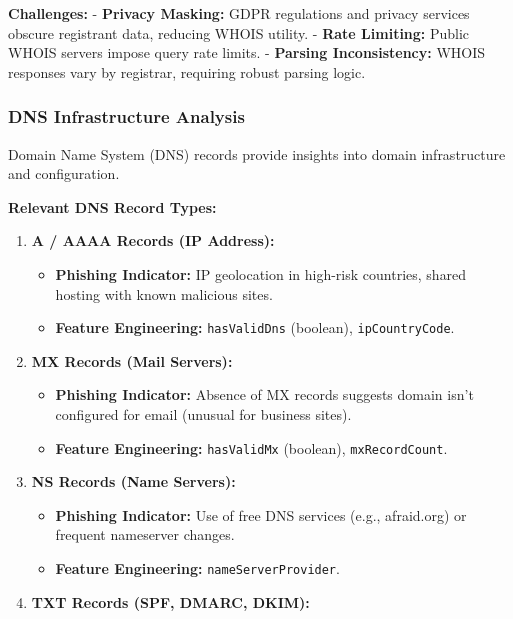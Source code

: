 \textbf{Challenges:} - \textbf{Privacy Masking:} GDPR regulations and
privacy services obscure registrant data, reducing WHOIS utility. -
\textbf{Rate Limiting:} Public WHOIS servers impose query rate limits. -
\textbf{Parsing Inconsistency:} WHOIS responses vary by registrar,
requiring robust parsing logic.

\subsubsection{DNS Infrastructure
Analysis}\label{dns-infrastructure-analysis}

Domain Name System (DNS) records provide insights into domain
infrastructure and configuration.

\textbf{Relevant DNS Record Types:}

\begin{enumerate}

\item
  \textbf{A / AAAA Records (IP Address):}

  \begin{itemize}
    \item
    \textbf{Phishing Indicator:} IP geolocation in high-risk countries,
    shared hosting with known malicious sites.
  \item
    \textbf{Feature Engineering:} \texttt{hasValidDns} (boolean),
    \texttt{ipCountryCode}.
  \end{itemize}
\item
  \textbf{MX Records (Mail Servers):}

  \begin{itemize}
    \item
    \textbf{Phishing Indicator:} Absence of MX records suggests domain
    isn't configured for email (unusual for business sites).
  \item
    \textbf{Feature Engineering:} \texttt{hasValidMx} (boolean),
    \texttt{mxRecordCount}.
  \end{itemize}
\item
  \textbf{NS Records (Name Servers):}

  \begin{itemize}
    \item
    \textbf{Phishing Indicator:} Use of free DNS services (e.g.,
    afraid.org) or frequent nameserver changes.
  \item
    \textbf{Feature Engineering:} \texttt{nameServerProvider}.
  \end{itemize}
\item
  \textbf{TXT Records (SPF, DMARC, DKIM):}


\end{enumerate}
